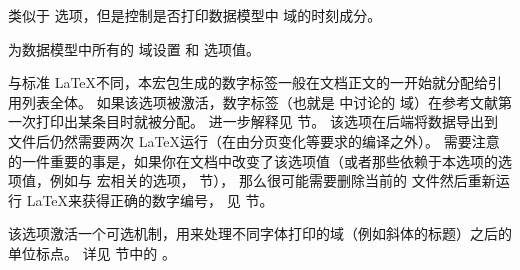 \begin{optionlist}
类似于  选项，但是控制是否打印数据模型中  域的时刻成分。



为数据模型中所有的  域设置  和  选项值。



与标准 \LaTeX 不同，本宏包生成的数字标签一般在文档正文的一开始就分配给引用列表全体。
如果该选项被激活，数字标签（也就是  中讨论的  域）在参考文献第一次打印出某条目时就被分配。
进一步解释见  节。
该选项在后端将数据导出到  文件后仍然需要两次 \LaTeX 运行（在由分页变化等要求的编译之外）。
需要注意的一件重要的事是，如果你在文档中改变了该选项值（或者那些依赖于本选项的选项值，例如与 宏相关的选项， 节），
那么很可能需要删除当前的  文件然后重新运行 \LaTeX 来获得正确的数字编号，
见  节。


该选项激活一个可选机制，用来处理不同字体打印的域（例如斜体的标题）之后的单位标点。
详见  节中的 。


\end{optionlist}
